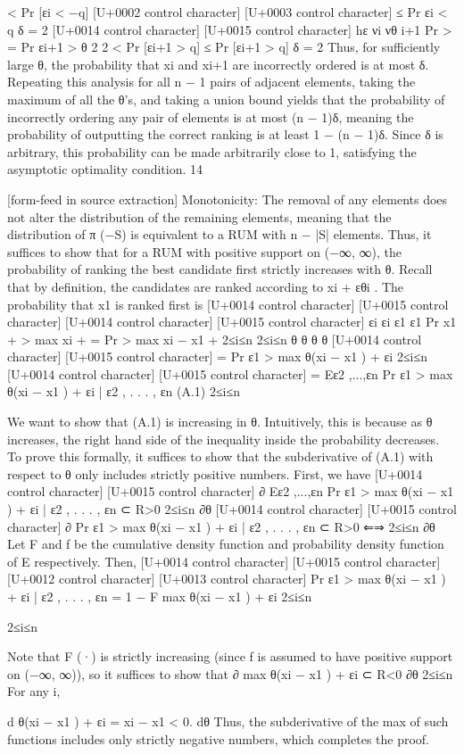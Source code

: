 \documentclass[10pt]{article}
\begin{document}
\begin{ReviewVerbatim}
< Pr [εi < −q]
[U+0002 control character]
[U+0003 control character]
≤ Pr εi < q
δ
=
2 [U+0014 control character]
[U+0015 control character]
hε
νi
νθ
i+1
Pr
>
= Pr εi+1 >
θ
2
2
< Pr [εi+1 > q]
≤ Pr [εi+1 > q]
δ
=
2
Thus, for sufficiently large θ, the probability that xi and xi+1 are incorrectly ordered is at most δ.
Repeating this analysis for all n − 1 pairs of adjacent elements, taking the maximum of all the θ’s, and
taking a union bound yields that the probability of incorrectly ordering any pair of elements is at most
(n − 1)δ, meaning the probability of outputting the correct ranking is at least 1 − (n − 1)δ. Since δ is
arbitrary, this probability can be made arbitrarily close to 1, satisfying the asymptotic optimality condition.
14


[form-feed in source extraction]
Monotonicity: The removal of any elements does not alter the distribution of the remaining elements,
meaning that the distribution of π (−S) is equivalent to a RUM with n − |S| elements. Thus, it suffices to
show that for a RUM with positive support on (−∞, ∞), the probability of ranking the best candidate first
strictly increases with θ.
Recall that by definition, the candidates are ranked according to xi + εθi . The probability that x1 is
ranked first is
[U+0014 control character]
[U+0015 control character]
[U+0014 control character]
[U+0015 control character]
εi
εi
ε1
ε1
Pr x1 +
> max xi +
= Pr
> max xi − x1 +
2≤i≤n
2≤i≤n
θ
θ
θ
θ
[U+0014 control character]
[U+0015 control character]
= Pr ε1 > max θ(xi − x1 ) + εi
2≤i≤n
[U+0014 control character]
[U+0015 control character]
= Eε2 ,...,εn Pr ε1 > max θ(xi − x1 ) + εi | ε2 , . . . , εn
(A.1)
2≤i≤n

We want to show that (A.1) is increasing in θ. Intuitively, this is because as θ increases, the right hand
side of the inequality inside the probability decreases. To prove this formally, it suffices to show that the
subderivative of (A.1) with respect to θ only includes strictly positive numbers. First, we have
[U+0014 control character]
[U+0015 control character]
∂
Eε2 ,...,εn Pr ε1 > max θ(xi − x1 ) + εi | ε2 , . . . , εn ⊂ R>0
2≤i≤n
∂θ
[U+0014 control character]
[U+0015 control character]
∂
Pr ε1 > max θ(xi − x1 ) + εi | ε2 , . . . , εn ⊂ R>0
⇐⇒
2≤i≤n
∂θ
Let F and f be the cumulative density function and probability density function of E respectively. Then,
[U+0014 control character]
[U+0015 control character]
[U+0012 control character]
[U+0013 control character]
Pr ε1 > max θ(xi − x1 ) + εi | ε2 , . . . , εn = 1 − F max θ(xi − x1 ) + εi
2≤i≤n

2≤i≤n

Note that F (·) is strictly increasing (since f is assumed to have positive support on (−∞, ∞)), so it suffices
to show that
∂
max θ(xi − x1 ) + εi ⊂ R<0
∂θ 2≤i≤n
For any i,

d
θ(xi − x1 ) + εi = xi − x1 < 0.
dθ
Thus, the subderivative of the max of such functions includes only strictly negative numbers, which completes
the proof.
\end{ReviewVerbatim}
\end{document}
